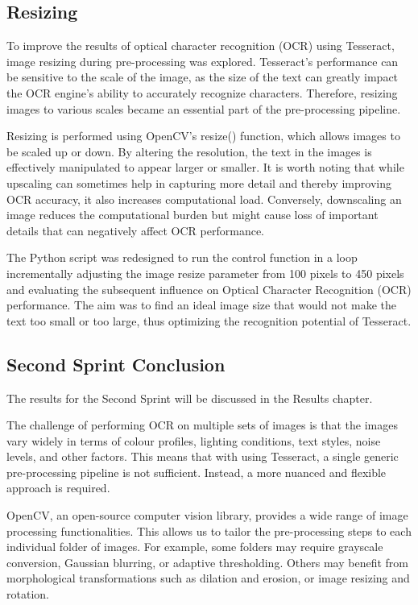 \subsection{Resizing}


To improve the results of optical character recognition (OCR) using Tesseract, image resizing during pre-processing was explored. Tesseract's performance can be sensitive to the scale of the image, as the size of the text can greatly impact the OCR engine's ability to accurately recognize characters. Therefore, resizing images to various scales became an essential part of the pre-processing pipeline.

Resizing is performed using OpenCV's resize() function, which allows images to be scaled up or down. By altering the resolution, the text in the images is effectively manipulated to appear larger or smaller. It is worth noting that while upscaling can sometimes help in capturing more detail and thereby improving OCR accuracy, it also increases computational load. Conversely, downscaling an image reduces the computational burden but might cause loss of important details that can negatively affect OCR performance. \cite{dasCovid19FaceMask2020}


The Python script was redesigned to run the control function in a loop incrementally adjusting the image resize parameter from 100 pixels to 450 pixels and evaluating the subsequent influence on Optical Character Recognition (OCR) performance. The aim was to find an ideal image size that would not make the text too small or too large, thus optimizing the recognition potential of Tesseract.


\subsection{Second Sprint Conclusion}

The results for the Second Sprint will be discussed in the Results chapter.

The challenge of performing OCR on multiple sets of images is that the images vary widely in terms of colour profiles, lighting conditions, text styles, noise levels, and other factors. This means that with using Tesseract, a single generic pre-processing pipeline is not sufficient. Instead, a more nuanced and flexible approach is required.

OpenCV, an open-source computer vision library, provides a wide range of image processing functionalities. This allows us to tailor the pre-processing steps to each individual folder of images. For example, some folders may require grayscale conversion, Gaussian blurring, or adaptive thresholding. Others may benefit from morphological transformations such as dilation and erosion, or image resizing and rotation.

